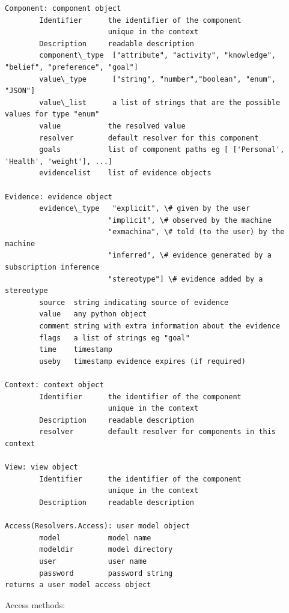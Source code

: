 \documentclass[a4paper,10pt,english]{sphinxmanual}
\begin{document}
\begin{Verbatim}[commandchars=\\\{\}]
Component: component object
        Identifier      the identifier of the component
                        unique in the context
        Description     readable description
        component\_type  ["attribute", "activity", "knowledge", "belief", "preference", "goal"]
        value\_type      ["string", "number","boolean", "enum", "JSON"]
        value\_list      a list of strings that are the possible values for type "enum"
        value           the resolved value
        resolver        default resolver for this component
        goals           list of component paths eg [ ['Personal', 'Health', 'weight'], ...]
        evidencelist    list of evidence objects

Evidence: evidence object
        evidence\_type   "explicit", \# given by the user
                        "implicit", \# observed by the machine
                        "exmachina", \# told (to the user) by the machine
                        "inferred", \# evidence generated by a subscription inference
                        "stereotype"] \# evidence added by a stereotype
        source  string indicating source of evidence
        value   any python object
        comment string with extra information about the evidence
        flags   a list of strings eg "goal"
        time    timestamp
        useby   timestamp evidence expires (if required)

Context: context object
        Identifier      the identifier of the component
                        unique in the context
        Description     readable description
        resolver        default resolver for components in this context

View: view object
        Identifier      the identifier of the component
                        unique in the context
        Description     readable description

Access(Resolvers.Access): user model object
        model           model name
        modeldir        model directory
        user            user name
        password        password string
returns a user model access object
\end{Verbatim}

Access methods:
\end{document}
